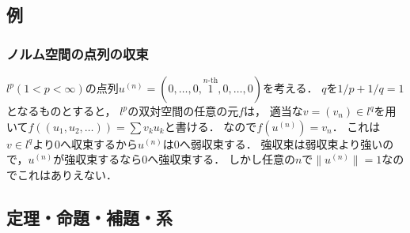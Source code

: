 \documentclass[a4j]{jsarticle}
\begin{document}
    \subsection{例}
    \subsubsection{ノルム空間の点列の収束}
    \begin{Example}[p.191]
        $l^p (1<p<\infty)$の点列$u^{(n)}=(0,\dots,0,\overset{n\text{-th}}{1},0,\dots,0)$を考える．
        $q$を$1/p+1/q=1$となるものとすると，
        $l^p$の双対空間の任意の元$f$は，
        適当な$v=(v_n) \in l^q$を用いて$f((u_1,u_2,\dots))=\sum v_k u_k$と書ける．
        なので$f(u^{(n)})=v_n$．
        これは$v \in l^q$より0へ収束するから$u^{(n)}$は0へ弱収束する．
        強収束は弱収束より強いので，$u^{(n)}$が強収束するなら0へ強収束する．
        しかし任意の$n$で$\|u^{(n)}\|=1$なのでこれはありえない．
    \end{Example}

    \subsection{定理・命題・補題・系}
\end{document}
